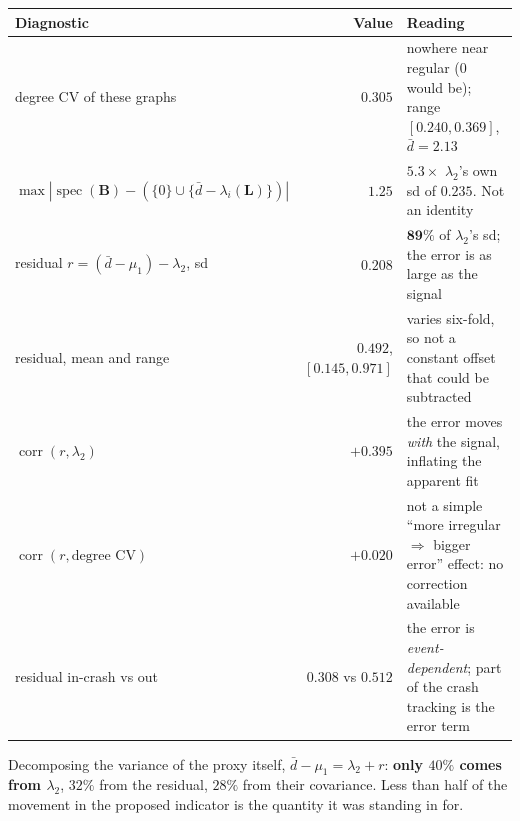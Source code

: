 \documentclass[11pt,a4paper]{article}
\newcommand{\Lap}{\mathbf{L}}
\newcommand{\Bmat}{\mathbf{B}}
\begin{document}
\begin{center}\small
\renewcommand{\arraystretch}{1.18}
\begin{tabular}{@{}>{\raggedright\arraybackslash}p{5.0cm}r
                  >{\raggedright\arraybackslash}p{7.3cm}@{}}
\toprule
\textbf{Diagnostic} & \textbf{Value} & \textbf{Reading} \\
\midrule
degree CV of these graphs & $0.305$ &
nowhere near regular ($0$ would be); range $[0.240,0.369]$, $\bar{d}=2.13$ \\
$\max|\operatorname{spec}(\Bmat)-(\{0\}\cup\{\bar d-\lambda_i(\Lap)\})|$ &
$\mathbf{1.25}$ & $5.3\times$ $\lambda_2$'s own sd of $0.235$. Not an identity \\
residual $r=(\bar d-\mu_1)-\lambda_2$, sd & $0.208$ &
$\mathbf{89\%}$ of $\lambda_2$'s sd; the error is as large as the signal \\
residual, mean and range & $0.492$, $[0.145,0.971]$ &
varies six-fold, so not a constant offset that could be subtracted \\
$\operatorname{corr}(r,\lambda_2)$ & $+0.395$ &
the error moves \emph{with} the signal, inflating the apparent fit \\
$\operatorname{corr}(r,\text{degree CV})$ & $+0.020$ &
not a simple ``more irregular $\Rightarrow$ bigger error'' effect: no correction available \\
residual in-crash vs out & $0.308$ vs $0.512$ &
the error is \emph{event-dependent}; part of the crash tracking is the error term \\
\bottomrule
\end{tabular}
\end{center}

Decomposing the variance of the proxy itself, $\bar d - \mu_1 = \lambda_2 + r$:
\textbf{only $40\%$ comes from $\lambda_2$}, $32\%$ from the residual, $28\%$ from
their covariance. Less than half of the movement in the proposed indicator is the
quantity it was standing in for.
\end{document}
